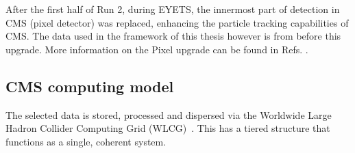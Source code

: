After the first half of Run 2, during EYETS, the innermost part of detection in CMS (pixel detector) was replaced, enhancing the particle tracking capabilities of CMS. The data used in the framework of this thesis however is from before this upgrade. More information on the Pixel upgrade can be found in Refs. \cite{CMS:2012sda,Perrey:1644757}.

\subsection{CMS computing model}
\label{sec:Computing}
The selected data is stored, processed and dispersed via the Worldwide Large Hadron Collider Computing Grid (WLCG)~\cite{Grandi:814248,Eck:840543}. This has a tiered structure that functions as a single, coherent system. 

